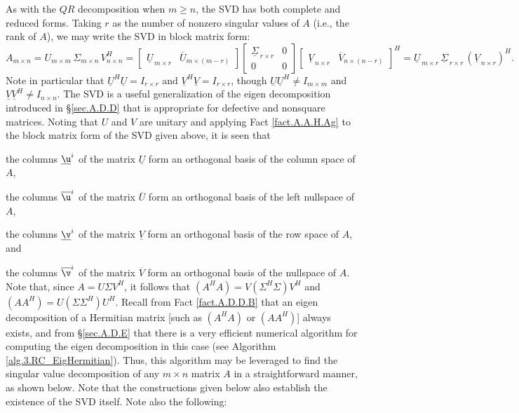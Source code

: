 As with the $QR$ decomposition when $m\ge n$, the SVD has both
complete and reduced forms.  Taking $r$ as the number of nonzero singular
values of $A$ (i.e., the rank of $A$), we may write the SVD in block
matrix form:
\begin{equation}
  A_{m\times n}=U_{m\times m} \,\Sigma_{m\times n} \,V^{H}_{n\times n} = 
  \begin{bmatrix} {\underline U}_{\,m \times r} & {\overline U}_{m \times (m-r)} \end{bmatrix}
  \begin{bmatrix} {\underline{\Sigma}}_{\,r \times r} & 0 \\ 
		  0 & 0 \end{bmatrix}
  \begin{bmatrix} {\underline V}_{\,n \times r} & {\overline V}_{n \times (n-r)} \end{bmatrix}^{H}
      ={\underline U}_{\,m\times r} \,{\underline{\Sigma}}_{\,r\times r} \,({\underline V}_{\,n\times r})^{H}. \label{SVDforms}
\end{equation}
Note in particular that $\underline U^H \underline U=I_{r\times r}$ and $\underline V^H \underline V=I_{r\times r}$,
though $\underline U \underline U^H \ne I_{m\times m}$ and $\underline V \underline V^H \ne I_{n\times n}$.
The SVD is a useful generalization of the eigen decomposition
introduced in \S \ref{sec.A.D.D} that is appropriate for defective and
nonsquare matrices.  Noting that $U$ and $V$ are unitary and applying
Fact \ref{fact.A.A.H.Ag} to the block matrix form of the SVD given
above, it is seen that
\beginmylistb
\item the columns $\underline\u^i$ of the matrix $\underline U$ form an orthogonal basis of the column space of $A$,
\item the columns $\overline\u^i$ of the matrix $\overline U$ form an orthogonal basis of the left nullspace of $A$,
\item the columns $\underline\v^i$ of the matrix $\underline V$ form an orthogonal basis of the row space of $A$, and
\item the columns $\overline\v^i$ of the matrix $\overline V$ form an orthogonal basis of the nullspace of $A$.
\endmylist
Note that, since $A=U \Sigma V^{H}$, it follows that $(A^{H}
A)=V (\Sigma^{H}\Sigma) V^{H}$ and $(A A^{H})=U (\Sigma\Sigma^{H})
U^{H}$.  Recall from Fact \ref{fact.A.D.D.B} that an eigen decomposition
of a Hermitian matrix [such as $(A^{H} A)$ or $(A
A^{H})$] always exists, and from \S \ref{sec.A.D.E} that there is a very efficient numerical algorithm for
computing the eigen decomposition in this case (see Algorithm \ref{alg.3.RC_EigHermitian}).  Thus, this algorithm may be leveraged
to find the singular value decomposition of any $m\times n$ matrix $A$
in a straightforward manner, as shown below.  Note that the
constructions given below also establish the existence of the SVD
itself.  Note also the following:

